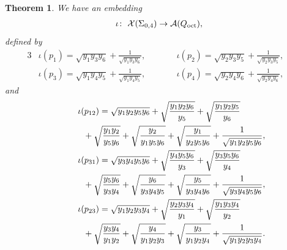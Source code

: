 \documentclass[pdftex]{sigma}
\numberwithin{equation}{section}
\newtheorem{Theorem}{Theorem}[section]
\begin{document}
\begin{Theorem} \label{thm:map_sphere} We have an embedding
 \begin{gather*}
 \iota\colon \ \mathcal{X}(\Sigma_{0,4}) \to \mathcal{A}(Q_{\text{\rm oct}}) ,
 \end{gather*}
 defined by
 \begin{alignat}{3}
& \iota({p}_{1})= \sqrt{y_1 y_3 y_6} + \frac{1}{\sqrt{y_1 y_3 y_6}} , \qquad && \iota({p}_2)= \sqrt{y_2 y_3 y_5} + \frac{1}{\sqrt{y_2 y_3 y_5}} ,&\nonumber \\
& \iota({p}_3)= \sqrt{y_1 y_4 y_5} + \frac{1}{\sqrt{y_1 y_4 y_5}} ,\qquad && \iota( {p}_4 )= \sqrt{y_2 y_4 y_6} + \frac{1}{\sqrt{y_2 y_4 y_6}} ,& \label{b_from_y}
 \end{alignat}
 and
 \begin{gather}
 \iota(p_{12})= \sqrt{y_1 y_2 y_5 y_6} + \sqrt{\frac{y_1 y_2 y_6}{y_5}} + \sqrt{\frac{y_1 y_2 y_5}{y_6}}\nonumber \\
 \hphantom{\iota(p_{12})=}{} + \sqrt{\frac{y_1 y_2}{y_5 y_6}} + \sqrt{\frac{y_2}{y_1 y_5 y_6}} + \sqrt{\frac{y_1}{y_2 y_5 y_6}} + \frac{1}{ \sqrt{y_1 y_2 y_5 y_6} },\nonumber\\
\iota(p_{31})= \sqrt{y_3 y_4 y_5 y_6} + \sqrt{\frac{y_4 y_5 y_6}{y_3}} + \sqrt{\frac{y_3 y_5 y_6}{y_4}}\nonumber \\
 \hphantom{\iota(p_{31})=}{} + \sqrt{\frac{y_5 y_6}{y_3 y_4}} + \sqrt{\frac{y_6}{y_3 y_4 y_5}} + \sqrt{\frac{y_5}{y_3 y_4 y_6}} + \frac{1}{ \sqrt{y_3 y_4 y_5 y_6} },\nonumber\\
\iota(p_{23})= \sqrt{y_1 y_2 y_3 y_4} + \sqrt{\frac{y_2 y_3 y_4}{y_1}} + \sqrt{\frac{y_1 y_3 y_4}{y_2}}\nonumber \\
\hphantom{\iota(p_{23})=}{} + \sqrt{\frac{y_3 y_4}{y_1 y_2}} + \sqrt{\frac{y_4}{y_1 y_2 y_3}} + \sqrt{\frac{y_3}{y_1 y_2 y_4}} + \frac{1}{ \sqrt{y_1 y_2 y_3 y_4} }. \label{x_from_y}
 \end{gather}
\end{Theorem}
\end{document}
